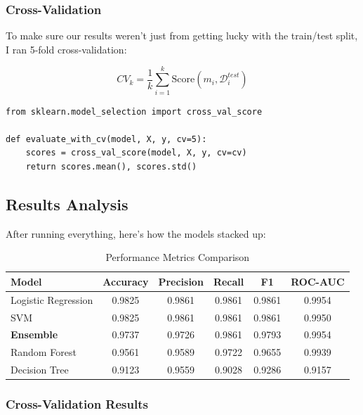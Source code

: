 \documentclass[12pt]{article}
\begin{document}
\subsubsection{Cross-Validation}
To make sure our results weren't just from getting lucky with the train/test split, I ran 5-fold cross-validation:

\begin{equation}
CV_k = \frac{1}{k} \sum_{i=1}^{k} \text{Score}(m_i, \mathcal{D}_i^{test})
\end{equation}

\begin{lstlisting}[style=pythonstyle, caption={Cross-Validation Implementation}]
from sklearn.model_selection import cross_val_score

def evaluate_with_cv(model, X, y, cv=5):
    scores = cross_val_score(model, X, y, cv=cv)
    return scores.mean(), scores.std()
\end{lstlisting}

\subsection{Results Analysis}

After running everything, here's how the models stacked up:

\begin{table}[H]
\centering
\caption{Performance Metrics Comparison}
\begin{tabular}{|l|c|c|c|c|c|}
\hline
\textbf{Model} & \textbf{Accuracy} & \textbf{Precision} & \textbf{Recall} & \textbf{F1} & \textbf{ROC-AUC} \\ \hline
Logistic Regression & 0.9825 & 0.9861 & 0.9861 & 0.9861 & 0.9954 \\ \hline
SVM & 0.9825 & 0.9861 & 0.9861 & 0.9861 & 0.9950 \\ \hline
\textbf{Ensemble} & 0.9737 & 0.9726 & 0.9861 & 0.9793 & 0.9954 \\ \hline
Random Forest & 0.9561 & 0.9589 & 0.9722 & 0.9655 & 0.9939 \\ \hline
Decision Tree & 0.9123 & 0.9559 & 0.9028 & 0.9286 & 0.9157 \\ \hline
\end{tabular}
\end{table}

\subsubsection{Cross-Validation Results}
\end{document}
